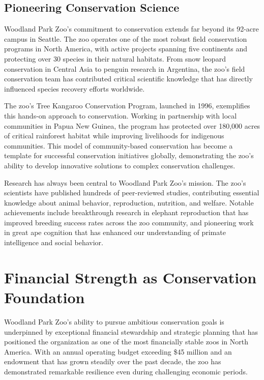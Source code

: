 \documentclass[
  Letterpaper,
]{scrbook}
\begin{document}
\subsection{Pioneering Conservation
Science}\label{pioneering-conservation-science}

Woodland Park Zoo's commitment to conservation extends far beyond its
92-acre campus in Seattle. The zoo operates one of the most robust field
conservation programs in North America, with active projects spanning
five continents and protecting over 30 species in their natural
habitats. From snow leopard conservation in Central Asia to penguin
research in Argentina, the zoo's field conservation team has contributed
critical scientific knowledge that has directly influenced species
recovery efforts worldwide.

The zoo's Tree Kangaroo Conservation Program, launched in 1996,
exemplifies this hands-on approach to conservation. Working in
partnership with local communities in Papua New Guinea, the program has
protected over 180,000 acres of critical rainforest habitat while
improving livelihoods for indigenous communities. This model of
community-based conservation has become a template for successful
conservation initiatives globally, demonstrating the zoo's ability to
develop innovative solutions to complex conservation challenges.

Research has always been central to Woodland Park Zoo's mission. The
zoo's scientists have published hundreds of peer-reviewed studies,
contributing essential knowledge about animal behavior, reproduction,
nutrition, and welfare. Notable achievements include breakthrough
research in elephant reproduction that has improved breeding success
rates across the zoo community, and pioneering work in great ape
cognition that has enhanced our understanding of primate intelligence
and social behavior.

\section{Financial Strength as Conservation
Foundation}\label{financial-strength-as-conservation-foundation}

Woodland Park Zoo's ability to pursue ambitious conservation goals is
underpinned by exceptional financial stewardship and strategic planning
that has positioned the organization as one of the most financially
stable zoos in North America. With an annual operating budget exceeding
\$45 million and an endowment that has grown steadily over the past
decade, the zoo has demonstrated remarkable resilience even during
challenging economic periods.
\end{document}
